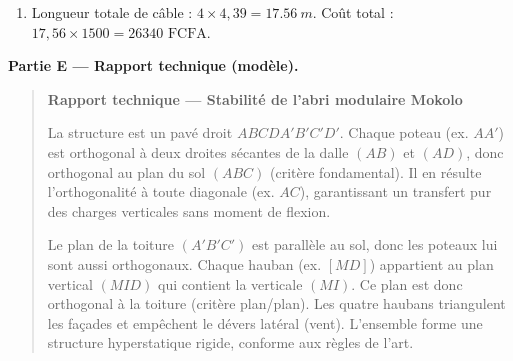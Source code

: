 \documentclass[11pt]{article}
\def\triangle{\mathord{\scalebox{0.9}{$\symup{\Delta}$}}}%
\begin{document}
\begin{exoresolu}
\begin{enumerate}[label=\arabic*., ref=\arabic*]
    \textbf{Calcul :}
    \begin{align*}
        MI &= AA' = \SI{2,5}{m}. \\
        ID &= \text{distance entre } I(2;0;0) \text{ et } D(0;3;0) \\
           &= \sqrt{(2-0)^2 + (0-3)^2 + (0-0)^2} \\
           &= \sqrt{4 + 9} = \sqrt{13} \approx \SI{3,606}{m}.
    \end{align*}
    Dans $\triangle MID$ rectangle en $I$, d'après Pythagore :
    \begin{align*}
        MD^2 &= MI^2 + ID^2 \\
             &= 2,5^2 + (\sqrt{13})^2 \\
             &= 6,25 + 13 = 19,25. \\
        MD &= \sqrt{19,25} \approx \SI{4,387}{m} \approx \boxed{\SI{4,39}{m}} \text{ (au cm près)}.
    \end{align*}
    \item Longueur totale de câble : $4 \times 4,39 = \SI{17,56}{m}$.
    Coût total : $17,56 \times \num{1500} = \boxed{\num{26340} \text{ FCFA}}$.
\end{enumerate}

\textbf{Partie E — Rapport technique (modèle).}

\begin{quote}
\textbf{Rapport technique — Stabilité de l'abri modulaire Mokolo}
\vspace{0.2cm}

La structure est un pavé droit $ABCDA'B'C'D'$. Chaque poteau (ex. $AA'$) est orthogonal à deux droites sécantes de la dalle $(AB)$ et $(AD)$, donc orthogonal au plan du sol $(ABC)$ (critère fondamental). Il en résulte l'orthogonalité à toute diagonale (ex. $AC$), garantissant un transfert pur des charges verticales sans moment de flexion.

Le plan de la toiture $(A'B'C')$ est parallèle au sol, donc les poteaux lui sont aussi orthogonaux. Chaque hauban (ex. $[MD]$) appartient au plan vertical $(MID)$ qui contient la verticale $(MI)$. Ce plan est donc orthogonal à la toiture (critère plan/plan). Les quatre haubans triangulent les façades et empêchent le dévers latéral (vent). L'ensemble forme une structure hyperstatique rigide, conforme aux règles de l'art.
\end{quote}
\end{exoresolu}
\end{document}
